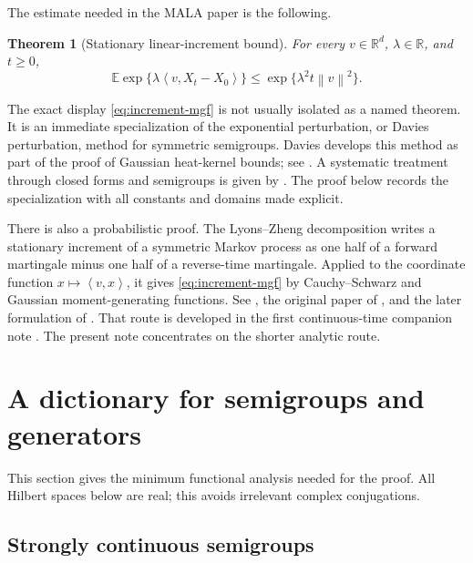 \documentclass[11pt]{article}
\newtheorem{theorem}{Theorem}[section]
\newcommand{\R}{\mathbb R}
\newcommand{\E}{\mathbb E}
\newcommand{\ip}[2]{\left\langle #1,#2\right\rangle}
\newcommand{\norm}[1]{\left\lVert #1\right\rVert}
\newcommand{\1}{\mathbf 1}
\begin{document}
The estimate needed in the MALA paper is the following.

\begin{theorem}[Stationary linear-increment bound]\label{thm:increment}
For every \(v\in\R^d\), \(\lambda\in\R\), and \(t\geq0\),
\begin{equation}\label{eq:increment-mgf}
 \E\exp\{\lambda\ip{v}{X_t-X_0}\}
 \leq
 \exp\{\lambda^2t\norm v^2\}.
\end{equation}
\end{theorem}

The exact display \eqref{eq:increment-mgf} is not usually isolated as a
named theorem.  It is an immediate specialization of the exponential
perturbation, or Davies perturbation, method for symmetric semigroups.
Davies develops this method as part of the proof of Gaussian heat-kernel
bounds; see \citet[Chapter~3]{Davies1989}.  A systematic treatment through
closed forms and semigroups is given by
\citet[Sections~1.3--1.5 and~6.3]{Ouhabaz2005}.  The proof below records the
specialization with all constants and domains made explicit.

There is also a probabilistic proof.  The Lyons--Zheng decomposition writes
a stationary increment of a symmetric Markov process as one half of a
forward martingale minus one half of a reverse-time martingale.  Applied to
the coordinate function \(x\mapsto\ip{v}{x}\), it gives
\eqref{eq:increment-mgf} by Cauchy--Schwarz and Gaussian moment-generating
functions.  See \citet[Section~5.7, especially Theorem~5.7.1]{FukushimaOshimaTakeda2011},
the original paper of \citet{LyonsZheng1988}, and the later formulation of
\citet{KuwaeUemura1997}.  That route is developed in the first continuous-time
companion note \citep{QinContinuousTimeCompanion2026}.  The present note
concentrates on the shorter analytic route.

\section{A dictionary for semigroups and generators}\label{sec:dictionary}

This section gives the minimum functional analysis needed for the proof.
All Hilbert spaces below are real; this avoids irrelevant complex
conjugations.

\subsection{Strongly continuous semigroups}
\end{document}
